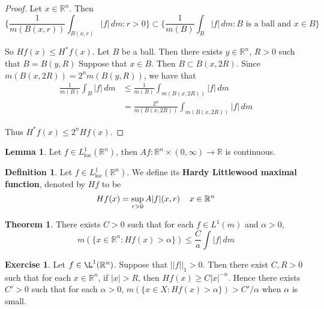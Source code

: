 \documentclass{book}
\theoremstyle{definition}
\newtheorem{defn}[definition]{Definition}
\newtheorem{thm}[definition]{Theorem}
\newtheorem{lem}[definition]{Lemma}
\newtheorem{ex}[definition]{Exercise}
\newcommand{\al}{\alpha}
\newcommand{\R}{\mathbb{R}}
\newcommand{\lex}[1]{\label{ex:#1}}
\newcommand{\ld}[1]{\label{defn:#1}}
\DeclareMathOperator*{\0}{\mbf{0}}
\DeclareMathOperator*{\1}{\mbf{1}}
\newcommand{\dm}{\, d m}
\newcommand{\Ll}{L^1_{\text{loc}}(\R^n)}
\begin{document}
	\begin{proof}
		Let $x \in \R^n$. Then $$\bigg \{ \frac{1}{m(B(x,r))}\int_{B(x,r)}|f|\dm: r >0\bigg \} \subset \bigg\{ \frac{1}{m(B)}\int_{B}|f|\dm: B \text{ is a ball and } x \in B \bigg\} $$
		
		So $Hf(x) \leq H^*f(x)$. Let $B$ be a ball. Then there exists $y \in \R^n$, $R>0$ such that $B = B(y,R)$ Suppose that $x \in B$. Then $B \subset B(x,2R)$. Since $m(B(x,2R)) = 2^n m(B(y,R))$, we have that 
		\begin{align*}
			\frac{1}{m(B)}\int_{B}|f|\dm
			& \leq \frac{1}{m(B)} \int_{m(B(x,2R))}|f|\dm\\
			&= \frac{2^n}{m(B(x,2R))} \int_{m(B(x,2R))}|f|\dm
		\end{align*}
		
		Thus $H^*f(x) \leq 2^n Hf(x)$.
	\end{proof}
	
	\begin{lem}
		Let $f \in \Ll$, then $Af:\R^n \times (0, \infty)\rightarrow \R$ is continuous.
	\end{lem}
	
	\begin{defn} \ld{00000} 
		Let $f \in \Ll$. We define its \textbf{Hardy Littlewood maximal function}, denoted by $Hf$ to be $$Hf(x) = \sup_{r>0} A|f|(x,r) \hspace{4mm} x \in \R^n$$
	\end{defn}
	
	\begin{thm}
		There exists $C >0$ such that for each $f \in L^1(m)$ and $\al > 0$, $$m(\{x \in \R^n: Hf(x) > \al\}) \leq \frac{C}{a} \int |f|\dm$$
	\end{thm}
	
	\begin{ex} \lex{00000} 
		Let $f \in \L^1(\R^n)$. Suppose that $||f||_1>0$. Then there exist $C,R>0$ such that for each $x \in \R^n$, if $|x| > R$, then $Hf(x) \geq C|x|^{-n}$. Hence there exists $C' > 0$ such that for each $\al >0$, $m(\{x \in X: Hf(x)>\alpha\}) > C'/\al$ when $\al$ is small. 
	\end{ex}
	
\end{document}
